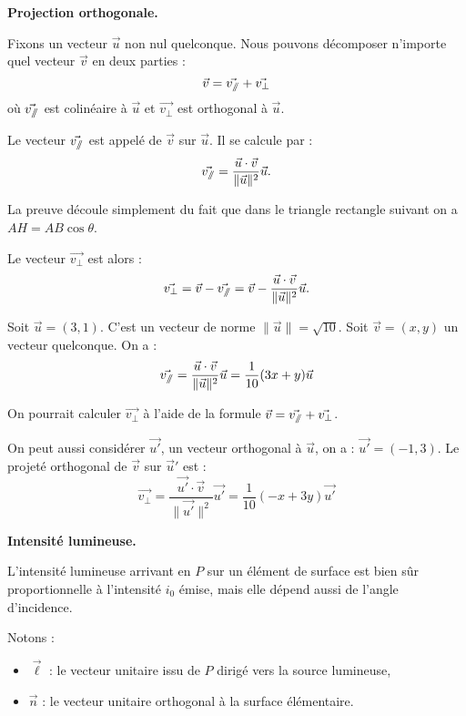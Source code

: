 \documentclass[11pt,class=report,crop=false]{standalone}
\begin{document}
\textbf{Projection orthogonale.}

Fixons un vecteur $\vec u$ non nul quelconque.
Nous pouvons décomposer n'importe quel vecteur $\vec v$ en deux parties :
$$\vec v  = \vec{v_{/\!\!/}} + \vec{v_{\perp}}$$
où $\vec{v_{/\!\!/}}$ est colinéaire à $\vec u$ et $\vec{v_{\perp}}$ est orthogonal à $\vec u$.


Le vecteur $\vec{v_{/\!\!/}}$ est appelé  de $\vec v$ sur $\vec u$. Il se calcule par :
$$
    \vec{v_{/\!\!/}} = \frac{\vec u \cdot \vec v}{\|\vec u\|^2} \vec u.
$$

La preuve découle simplement du fait que dans le triangle rectangle suivant on a 
$AH = AB \cos \theta$.


Le vecteur $\vec{v_{\perp}}$ est alors :
$$
    \vec{v_{\perp}} = \vec v - \vec{v_{/\!\!/}} = \vec v - \frac{\vec u \cdot \vec v}{\|\vec u\|^2} \vec u.
$$

\begin{exemple}
Soit $\vec u = (3,1)$. C'est un vecteur de norme $\| \vec u \| = \sqrt{10}$.
Soit $\vec v = (x,y)$ un vecteur quelconque.
On a :
$$\vec{v_{/\!\!/}} =
\frac{\vec u \cdot \vec v}{\|\vec u\|^2} \vec u
= \frac{1}{10}(3 x +  y) \vec u
$$

On pourrait calculer $\vec{v_{\perp}}$ à l'aide de la formule 
$\vec v = \vec{v_{/\!\!/}}  + \vec{v_{\perp}}$.

On peut aussi considérer $\vec{u'}$, un vecteur orthogonal à $\vec u$, on a :
$\vec{u'} = (-1,3)$. Le projeté orthogonal de $\vec v$ sur $\vec u'$ est :
$$\vec{v_{\perp}} =
\frac{\vec{u'} \cdot \vec v}{\|\vec {u'}\|^2} \vec {u'}
= \frac{1}{10}(- x + 3y) \vec {u'}
$$


\end{exemple}



\textbf{Intensité lumineuse.}

L'intensité lumineuse arrivant en $P$ sur un élément de surface est bien sûr proportionnelle à l'intensité $i_0$ émise, mais elle dépend aussi de l'angle d'incidence.

Notons :
\begin{itemize}
    \item $\vec \ell$ : le vecteur unitaire issu de $P$ dirigé vers la source lumineuse,
    \item $\vec n$ : le vecteur unitaire orthogonal à la surface élémentaire.
\end{itemize}
\end{document}
